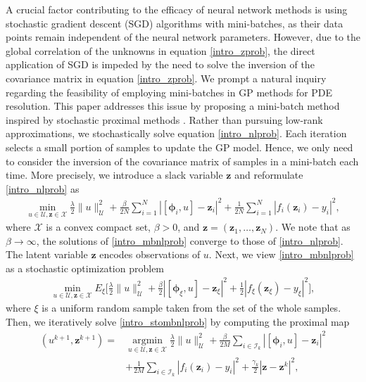 \documentclass[10pt,reqno]{amsart}
\newcommand{\argmin}{\operatorname{argmin}}
\newcommand{\1}{{\chi}}
\numberwithin{equation}{section}
\theoremstyle{thmlemcorr}
\numberwithin{theorem}{section}
\theoremstyle{thmlemcorr*}
\theoremstyle{defi}
\theoremstyle{remexample}
\theoremstyle{ass}
\begin{document}
A crucial factor contributing to the efficacy of neural network methods  \cite{raissi2019physics, zang2020weak, mao2020physics, karniadakis2021physics}  is using stochastic gradient descent (SGD) algorithms with mini-batches, as their data points remain independent of the neural network parameters. However, due to the global correlation of the unknowns in equation  \eqref{intro_zprob}, the direct application of SGD is impeded by the need to solve the inversion of the covariance matrix in equation \eqref{intro_zprob}. We prompt a natural inquiry regarding the feasibility of employing mini-batches in GP methods for PDE resolution. This paper addresses this issue by proposing a mini-batch method inspired by stochastic proximal methods \cite{davis2019stochastic, asi2019importance, asi2019stochastic}. Rather than pursuing low-rank approximations, we stochastically solve equation  \eqref{intro_nlprob}. Each iteration selects a small portion of samples to update the GP model. Hence, we only need to consider the inversion of the covariance matrix of samples in a mini-batch each time. More precisely, we introduce a slack variable $\boldsymbol{z}$ and reformulate \eqref{intro_nlprob} as
\begin{align}
	\label{intro_mbnlprob}
	\min_{u\in \mathcal{U}, \boldsymbol{z}\in \mathcal{X}}\frac{\lambda}{2}\|u\|_{\mathcal{U}}^2 + \frac{\beta}{2N}\sum_{i=1}^N|[\boldsymbol{\phi}_i, u]-\boldsymbol{z}_i|^2 + \frac{1}{2N}\sum_{i=1}^N|f_i(\boldsymbol{z}_i)-{y}_i|^2,
\end{align}
where $\mathcal{X}$ is a convex compact set, $\beta>0$, and $\boldsymbol{z}=(\boldsymbol{z}_1,\dots,\boldsymbol{z}_N)$. We note that as $\beta\rightarrow \infty$, the solutions of \eqref{intro_mbnlprob} converge to those of \eqref{intro_nlprob}. The latent variable $\boldsymbol{z}$ encodes observations of $u$. Next, we view \eqref{intro_mbnlprob} as a stochastic optimization problem
\begin{align}
	\label{intro_stombnlprob}
	\min_{u\in \mathcal{U}, \boldsymbol{z}\in \mathcal{X}}E_{\xi}\bigg[\frac{\lambda}{2}\|u\|_{\mathcal{U}}^2 + \frac{\beta}{2}|[\boldsymbol{\phi}_\xi, u]-\boldsymbol{z}_\xi|^2 + \frac{1}{2}|f_\xi(\boldsymbol{z}_\xi)-{y}_\xi|^2\bigg],
\end{align}
where $\xi$ is a uniform random sample taken from the set of the whole samples. Then,  we iteratively solve \eqref{intro_stombnlprob} by computing the proximal map
\begin{align}
	\label{intro_stopm}
	(u^{k+1}, \boldsymbol{z}^{k+1}) =& \argmin\limits_{u\in \mathcal{U}, \boldsymbol{z}\in \mathcal{X}}\frac{\lambda}{2}\|u\|_{\mathcal{U}}^2 + \frac{\beta}{2M}\sum_{i\in \mathcal{I}_k}|[\boldsymbol{\phi}_i, u]-\boldsymbol{z}_i|^2\nonumber \\
	& + \frac{1}{2M}\sum_{i\in \mathcal{I}_k}|f_i(\boldsymbol{z}_i)-{y}_i|^2 + \frac{\gamma_k}{2}|\boldsymbol{z} - \boldsymbol{z}^k|^2,
\end{align}
\end{document}
